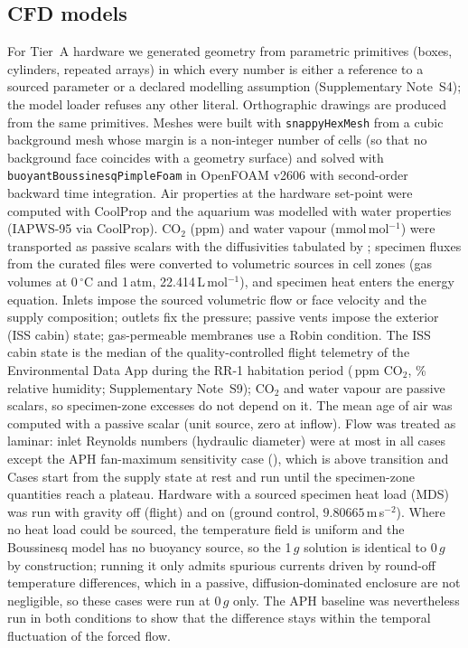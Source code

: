 \documentclass[11pt]{article}
\begin{document}
\subsection{CFD models}
For Tier~A hardware we generated geometry from parametric primitives (boxes, cylinders, repeated arrays)
in which every number is either a reference to a sourced parameter or a declared modelling assumption
(Supplementary Note~S4); the model loader refuses any other literal. Orthographic
drawings are produced from the same primitives. Meshes were built with \texttt{snappyHexMesh} from a
cubic background mesh whose margin is a non-integer number of cells (so that no background face coincides
with a geometry surface) and solved with \texttt{buoyantBoussinesqPimpleFoam} in OpenFOAM v2606
\citep{weller1998,openfoam2606} with second-order backward time integration. Air properties at the
hardware set-point were computed with CoolProp \citep{bell2014,lemmon2000,lemmon2004} and the aquarium was
modelled with water properties (IAPWS-95 via CoolProp). CO$_2$ (ppm) and water vapour
(mmol\,mol$^{-1}$) were transported as passive scalars with the diffusivities tabulated by
\citet{monteith2008}; specimen fluxes from the curated files were converted to volumetric sources in cell
zones (gas volumes at 0\,$^\circ$C and 1\,atm, 22.414\,L\,mol$^{-1}$), and specimen heat enters the energy
equation. Inlets impose the sourced volumetric flow or face velocity and the supply composition; outlets
fix the pressure; passive vents impose the exterior (ISS cabin) state; gas-permeable membranes use a Robin
condition. The ISS cabin state is the median of the quality-controlled flight telemetry of the Environmental Data App
during the RR-1 habitation period (\hwEdaCabinCo{}\,ppm CO$_2$, \hwEdaCabinRh\% relative humidity;
Supplementary Note~S9); CO$_2$ and water vapour are passive scalars, so specimen-zone excesses do not depend on it. The mean age of air was computed with a passive scalar (unit source, zero at inflow). Flow was
treated as laminar: inlet Reynolds numbers (hydraulic diameter) were at most \hwCfdMaxReInletLaminar{} in
all cases except the APH fan-maximum sensitivity case (\hwCfdReInletFanmax{}), which is above transition and
Cases start from the supply state at rest and run until the specimen-zone quantities reach a plateau.
Hardware with a sourced specimen heat load (MDS) was run with gravity off (flight) and on (ground control,
$9.80665$\,m\,s$^{-2}$). Where no heat load could be sourced, the temperature field is uniform and the
Boussinesq model has no buoyancy source, so the 1\,$g$ solution is identical to 0\,$g$ by construction; running
it only admits spurious currents driven by round-off temperature differences, which in a passive,
diffusion-dominated enclosure are not negligible, so these cases were run at 0\,$g$ only. The APH baseline was nevertheless run in both
conditions to show that the difference stays within the temporal fluctuation of the forced flow.
\end{document}
